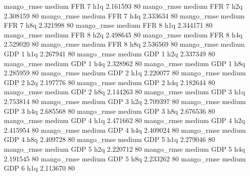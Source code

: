        mango_rmse     medium      FFR                 7                  h1q  2.161593 80
       mango_rmse     medium      FFR                 7                  h2q  2.308159 80
       mango_rmse     medium      FFR                 7                  h4q  2.333634 80
       mango_rmse     medium      FFR                 7                  h8q  2.321998 80
       mango_rmse     medium      FFR                 8                  h1q  2.344171 80
       mango_rmse     medium      FFR                 8                  h2q  2.498645 80
       mango_rmse     medium      FFR                 8                  h4q  2.529020 80
       mango_rmse     medium      FFR                 8                  h8q  2.536569 80
       mango_rmse     medium      GDP                 1                  h1q  2.267941 80
       mango_rmse     medium      GDP                 1                  h2q  2.337349 80
       mango_rmse     medium      GDP                 1                  h4q  2.328962 80
       mango_rmse     medium      GDP                 1                  h8q  2.285959 80
       mango_rmse     medium      GDP                 2                  h1q  2.220077 80
       mango_rmse     medium      GDP                 2                  h2q  2.197776 80
       mango_rmse     medium      GDP                 2                  h4q  2.182644 80
       mango_rmse     medium      GDP                 2                  h8q  2.144263 80
       mango_rmse     medium      GDP                 3                  h1q  2.753814 80
       mango_rmse     medium      GDP                 3                  h2q  2.709397 80
       mango_rmse     medium      GDP                 3                  h4q  2.685568 80
       mango_rmse     medium      GDP                 3                  h8q  2.676536 80
       mango_rmse     medium      GDP                 4                  h1q  2.471662 80
       mango_rmse     medium      GDP                 4                  h2q  2.415954 80
       mango_rmse     medium      GDP                 4                  h4q  2.409024 80
       mango_rmse     medium      GDP                 4                  h8q  2.409728 80
       mango_rmse     medium      GDP                 5                  h1q  2.279046 80
       mango_rmse     medium      GDP                 5                  h2q  2.220712 80
       mango_rmse     medium      GDP                 5                  h4q  2.191545 80
       mango_rmse     medium      GDP                 5                  h8q  2.233262 80
       mango_rmse     medium      GDP                 6                  h1q  2.113670 80
